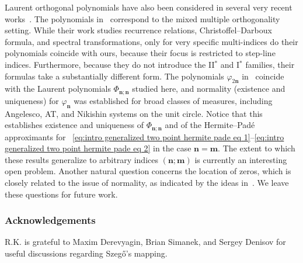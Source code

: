 \documentclass[reqno,centertags,11pt,draft]{amsart}
\begin{document}



Laurent orthogonal polynomials have also been considered in several very recent works~\cites{KVMLOPUC1,KNik,HueMan}. 
The polynomials in~\cite{HueMan} correspond to the mixed multiple orthogonality setting. While their work studies recurrence relations, Christoffel--Darboux formula, and spectral transformations, only for very specific multi-indices do their polynomials coincide with ours, because their focus is restricted to step-line indices. Furthermore, because they do not introduce the II${}^*$ and I${}^*$ families, their formulas take a substantially different form.
The polynomials $\varphi_{2\bm{n}}$ in~\cite{KVMLOPUC1,KNik} coincide with the Laurent polynomials $\Phi_{\bm{n};\bm{n}}$ studied here, and normality (existence and uniqueness) for $\varphi_{\bm{n}}$ was established for broad classes of measures, including Angelesco, AT, and Nikishin systems on the unit circle. Notice that this establishes existence and uniqueness of $\Phi_{\bm{n};\bm{n}}$ and of the Hermite--Pad\'{e} approximants for ~\eqref{eq:intro generalized two point hermite pade eq 1}--\eqref{eq:intro generalized two point hermite pade eq 2} in the case $\bm{n}=\bm{m}$. The extent to which these results generalize to arbitrary indices $(\bm{n};\bm{m})$ is currently an interesting open problem. Another natural question concerns the location of zeros, which is closely related to the issue of normality, as indicated by the ideas in~\cite{KVInterlacing}. We leave these questions for future work.

\subsubsection*{Acknowledgements}
R.K. is grateful to  Maxim Derevyagin, Brian Simanek, and Sergey Denisov for useful discussions regarding Szeg\H{o}'s mapping. 
\end{document}
